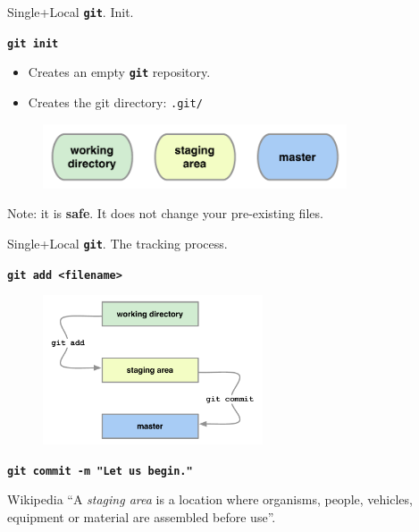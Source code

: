 \documentclass{beamer}
\newcommand{\git}{\texttt{\textbf{git}}\xspace}
\begin{document}
\begin{frame}{Single+Local \git. Init.}
  \begin{center}
    \texttt{\textbf{git init}}
  \end{center}
  \begin{itemize}
  \item Creates an empty \git repository.
  \item Creates the git directory: \texttt{.git/}
  \end{itemize}
  \begin{figure}
    \centering
    \includegraphics[width=9cm]{figs/local-init}
  \end{figure}
  Note: it is \textbf{safe}. It does not change your pre-existing
  files.
\end{frame}

\begin{frame}{Single+Local \git. The tracking process.}
  \begin{center}
    \texttt{\textbf{git add <filename>}}
  \end{center}
  \begin{figure}
    \centering
    \includegraphics[width=6.5cm]{figs/staging}
  \end{figure}
  \begin{center}
    \texttt{\textbf{git commit -m "Let us begin."}}
  \end{center}

  \begin{block}{Wikipedia}
    ``A \emph{staging area} is a location where organisms, people,
    vehicles, equipment or material are assembled before use''.
  \end{block}
\end{frame}
\end{document}
